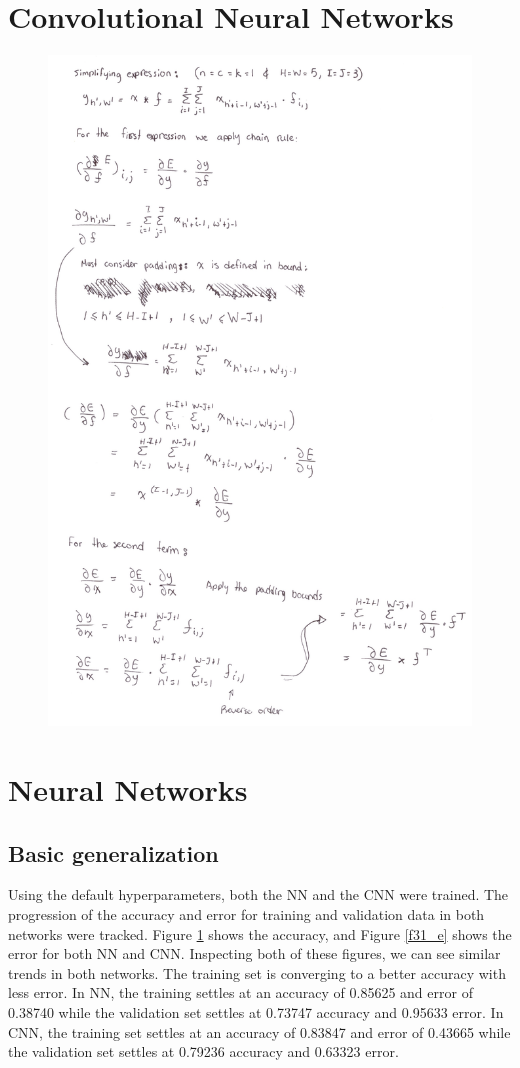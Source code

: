 \documentclass[12pt]{article}
\begin{document}
\section{Convolutional Neural Networks}
\begin{figure}[!htb]
\centering
\includegraphics[width=0.7\linewidth]{2/Image.jpg}
\vspace{-0.1in}
\caption{}
\label{f31_a}
\vspace{-0.1in}
\end{figure}

\section{Neural Networks}
\subsection{Basic generalization}

Using the default hyperparameters, both the NN and the CNN were trained. The progression of the accuracy and error for training and validation data in both networks were tracked. Figure \ref{f31_a} shows the accuracy, and Figure \ref{f31_e} shows the error for both NN and CNN. Inspecting both of these figures, we can see similar trends in both networks. The training set is converging to a better accuracy with less error. In NN, the training settles at an accuracy of 0.85625 and error of 0.38740 while the validation set settles at 0.73747 accuracy and 0.95633 error. In CNN, the training set settles at an accuracy of 0.83847 and error of 0.43665 while the validation set settles at 0.79236 accuracy and 0.63323 error. 
\end{document}
